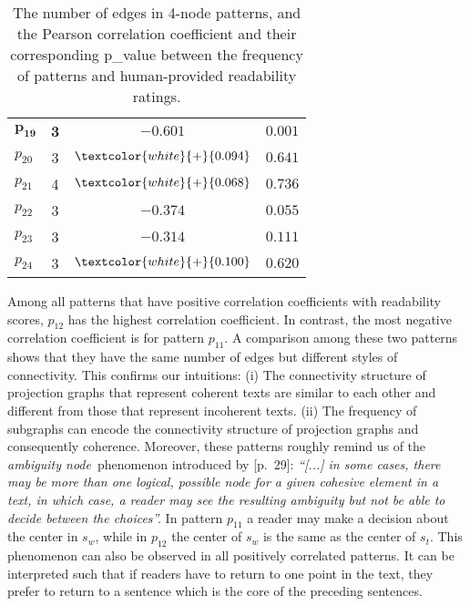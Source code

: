 \begin{table}[!ht]
\begin{center}
\begin{tabular}{lccc}
			$\mathbf{p_{19}}$	& \textbf{3} 	  & $\mathbf{-0.601}$ 				& $\mathbf{0.001}$			\\
			$p_{20}$			& 3 			  & $\textcolor{white}{+}{0.094}$   & $0.641$					\\
			$p_{21}$			& 4 			  & $\textcolor{white}{+}{0.068}$	& $0.736$				    \\
			$p_{22}$			& 3				  & $-0.374$ 						& $0.055$					\\
			$p_{23}$			& 3				  & $-0.314$ 						& $0.111$					\\
			$p_{24}$ 			& 3				  & $\textcolor{white}{+}{0.100}$   & $0.620$					\\
			\bottomrule
		\end{tabular}
	\end{center}
	\caption{The number of edges in 4-node patterns, and the Pearson correlation coefficient and their corresponding p\_value between the frequency of patterns and human-provided readability ratings.} 
	\label{tab:correlation-4node}
\end{table}

Among all patterns that have positive correlation coefficients with readability scores, $p_{12}$ has the highest correlation coefficient. 
In contrast, the most negative correlation coefficient is for pattern $p_{11}$. 
A comparison among these two patterns shows that they have the same number of edges but different styles of connectivity.
This confirms our intuitions: (i) The connectivity structure of projection graphs that represent coherent texts are similar to each other and different from those that represent incoherent texts. 
(ii) The frequency of subgraphs can encode the connectivity structure of projection graphs and consequently coherence. 
Moreover, these patterns roughly remind us of the \emph{ambiguity node}\ phenomenon introduced by  [p.\ 29]: 
\emph{
	``[...] in some cases, there may be more
	than one logical, possible node for a given cohesive element in a text, in which case, a reader may see the resulting ambiguity but not be able to decide between the choices''.
	}
In pattern $p_{11}$ a reader may make a decision about the center in $s_w$, while in $p_{12}$ the center of $s_w$ is the same as the center of $s_t$. 
This phenomenon can also be observed in all positively correlated patterns.  
It can be interpreted such that if readers have to return to one point in the text, they prefer to return to a sentence which is the core of the preceding sentences.

